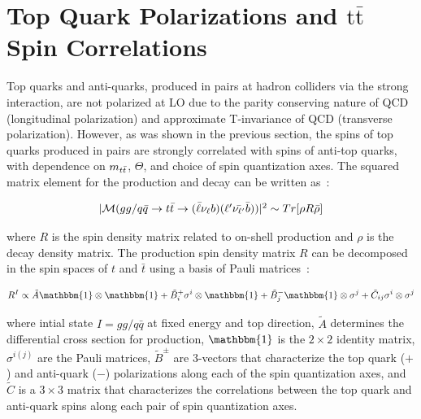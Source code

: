 \section{Top Quark Polarizations and \ensuremath{\mathrm{t\bar{t}}} Spin Correlations}
\label{Top_Quark_Polarizations_and_ttbar_Spin_Correlations}
Top quarks and anti-quarks, produced in \ttbar pairs at hadron colliders via the strong interaction, are not polarized at LO due to the parity conserving nature of QCD (longitudinal polarization) and approximate T-invariance of QCD (transverse polarization).
However, as was shown in the previous section, the spins of top quarks produced in \ttbar pairs are strongly correlated with spins of anti-top quarks, with dependence on $m_{t\bar{t}}$, $\Theta$, and choice of spin quantization axes. 
The squared matrix element for the \ttbar production and decay can be written as~\cite{Bernreuther}:
\begin{linenomath*}
\begin{align}
\begin{array}{c}
\vert\mathcal{M}(gg/q\bar{q} \to t\bar{t} \to (\bar{\ell} \nu_\ell b)(\ell^\prime \bar{\nu_{\ell^\prime}} \bar{b}) )\vert^2 \sim Tr[\rho R \bar{\rho}]
\end{array}
\label{ttbar_squared_matrix_element}
\end{align}
\end{linenomath*}
where $R$ is the spin density matrix related to on-shell \ttbar production and $\rho$ is the decay density matrix.
The production spin density matrix $R$ can be decomposed in the spin spaces of $t$ and $\bar{t}$ using a basis of Pauli matrices~\cite{Bernreuther}:
\begin{linenomath*}
\begin{align}
R^I \propto \tilde{A} \mathbbm{1} \otimes  \mathbbm{1} + \tilde{B}_i^+ \sigma^i \otimes \mathbbm{1} + \tilde{B}_j^- \mathbbm{1} \otimes \sigma^j + \tilde{C}_{ij} \sigma^i \otimes \sigma^j
\label{spin_density_matrix_decomposition}
\end{align}
\end{linenomath*}
where intial state $I = gg / q\bar{q}$ at fixed energy and top direction, $\tilde{A}$ determines the differential cross section for \ttbar production, $\mathbbm{1}$ is the $2\times2$ identity matrix, $\sigma^{i(j)}$ are the Pauli matrices, $\tilde{B}^\pm$ are 3-vectors that characterize the top quark ($+$) and anti-quark ($-$) polarizations along each of the spin quantization axes, and $\tilde{C}$ is a $3\times3$ matrix that characterizes the correlations between the top quark and anti-quark spins along each pair of spin quantization axes.
